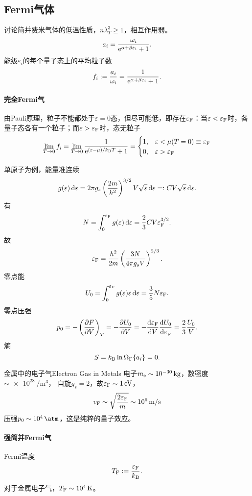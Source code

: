 \subsection{Fermi气体}
讨论简并费米气体的低温性质，$n\lambda_T^3\geqslant 1$，相互作用弱。
\[
	a_i=\frac{\omega_i}{\e{\alpha+\beta\varepsilon_i}+1}.
\]
能级$\varepsilon_i$的每个量子态上的平均粒子数
\[
	f_i:=\frac{a_i}{\omega_i}=\frac1{\e{\alpha+\beta\varepsilon_i}+1}.
\]
\paragraph*{完全Fermi气}由Pauli原理，粒子不能都处于$\varepsilon=0$态，但尽可能低，即存在$\varepsilon_\Fm$：当$\varepsilon<\varepsilon_\Fm$时，各量子态各有一个粒子；而$\varepsilon>\varepsilon_\Fm$时，态无粒子
\[
	\lim_{T\to0}f_i=\lim_{T\to0}\frac1{\e{(\varepsilon-\mu)/\kB T}+1}=\begin{cases}
	1,&\varepsilon<\mu(T=0)\equiv\varepsilon_\Fm\\0,&\varepsilon>\varepsilon_\Fm
\end{cases}
\]

单原子为例，能量准连续
\[
	g(\varepsilon)\d\varepsilon=2\pi g_s\kh{\frac{2m}{h^2}}^{3/2}V\sqrt\varepsilon\d\varepsilon=:CV\sqrt\varepsilon\d\varepsilon.
\]
有
\[
	N=\int_0^{\varepsilon_\Fm}g(\varepsilon)\d\varepsilon=\frac23CV\varepsilon_\Fm^{3/2}.
\]
故
\begin{align}
	\varepsilon_\Fm=\frac{h^2}{2m}\kh{\frac{3N}{4\pi g_sV}}^{2/3}.
\end{align}
零点能
\begin{align}
	U_0=\int_0^{\varepsilon_\Fm}g(\varepsilon)\varepsilon\d\varepsilon=\frac35N\varepsilon_\Fm.
\end{align}
零点压强
\[
	p_0=-\kh{\pv FV}_T=-\pv{U_0}V=-\dv{\varepsilon_\Fm}V\dv{U_0}{\varepsilon_\Fm}=\frac23\frac{U_0}V.
\]
熵
\[
	S=\kB\ln\Om[F]=0.
\]
\begin{example}{金属中的电子气}{Electron Gas in Metals}
	电子$m_\elc\sim\SI{e-30}\kg$，数密度$\sim\SI{e28}{\per\m\cubed}$， %
	自旋$g_s=2$，故$\varepsilon_\Fm\sim\SI1\eV$，
	\[
	v_\Fm\sim\sqrt{\frac{2\varepsilon_\Fm}m}\sim\SI[per-mode=symbol]{e6}{\m\per\s}
\]
	压强$p_0\sim\SI{e4}\atm$，这是纯粹的量子效应。
\end{example}
\paragraph*{强简并Fermi气}Fermi温度
\[
	T_\Fm:=\frac{\varepsilon_\Fm}\kB.
\]
对于金属电子气，$T_\Fm\sim\SI{e4}\K$。

